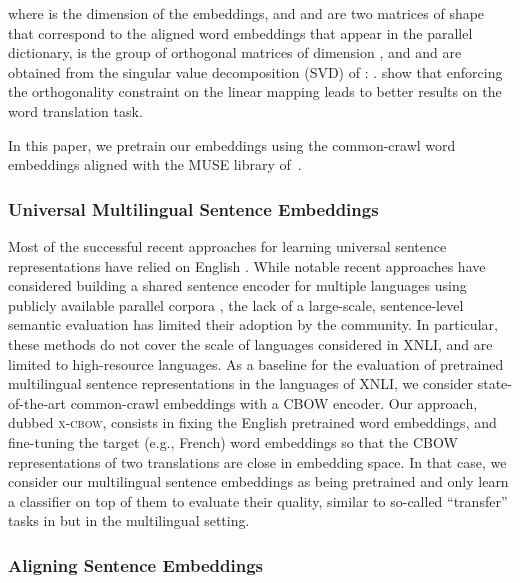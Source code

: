 \documentclass[11pt,a4paper]{article}
\begin{document}
where  is the dimension of the embeddings, and  and  are two matrices of shape  that correspond to the aligned word embeddings that appear in the parallel dictionary,  is the group of orthogonal matrices of dimension , and  and  are obtained from the singular value decomposition (SVD) of : . \citet{xing2015normalized} show that enforcing the ortho\-gonality constraint on the linear mapping leads to better results on the word translation task.

In this paper, we pretrain our embeddings using the common-crawl word embeddings \cite{grave2018learning} aligned with the MUSE library of~\citet{Conneau:2018:iclr_muse}.


\subsubsection{Universal Multilingual Sentence Embeddings}
Most of the successful recent approaches for learning universal sentence representations have relied on English \cite{kiros2015skip,arora2016asimple,conneau2017supervised,subramanian2018learning,cer2018universal}. While notable recent approaches  have considered building a shared sentence encoder for multiple languages using publicly available parallel corpora \cite{johnson2016google,Schwenk:2017:repl4nlp,epsana:2017:ieee_embed_mine}, the lack of a large-scale, sentence-level semantic  evaluation has limited their adoption by the community. In particular, these methods do not cover the scale of languages considered in XNLI, and are limited to high-resource languages. As a baseline for the evaluation of pretrained multilingual sentence representations in the \nlangs languages of XNLI, we consider state-of-the-art common-crawl embeddings with a CBOW encoder. 
Our approach, dubbed \textsc{x-cbow}, consists in fixing the English pretrained word embeddings, and fine-tuning the target (e.g., French) word embeddings so that the CBOW representations of two translations are close in embedding space.
In that case, we consider our multilingual sentence embeddings as being pretrained and only learn a classifier on top of them to evaluate their quality, similar to so-called ``transfer'' tasks in \cite{kiros2015skip, conneau2017supervised} but in the multilingual setting.


\subsubsection{Aligning Sentence Embeddings}
\label{sec:alignment}
\end{document}
